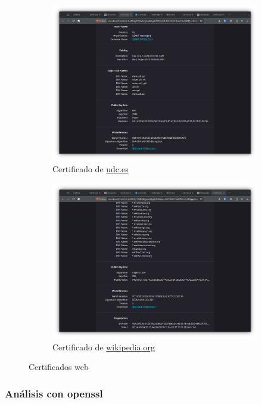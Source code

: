 \begin{figure}[H]
    \begin{subfigure}{.5\textwidth}
        \centering
        \includegraphics[width=\textwidth]{cert-udc.png}
        \caption{Certificado de \url{udc.es}}
    \end{subfigure}%
    \begin{subfigure}{.5\textwidth}
        \centering
        \includegraphics[width=\textwidth]{cert-wikipedia.png}
        \caption{Certificado de \url{wikipedia.org}}
    \end{subfigure}
    \caption{Certificados web}
\end{figure}

\subsubsection{Análisis con openssl}

